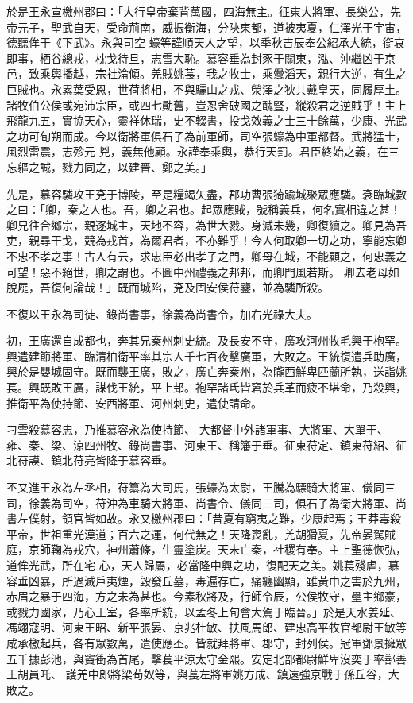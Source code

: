 \begin{pinyinscope}
 於是王永宣檄州郡曰：「大行皇帝棄背萬國，四海無主。征東大將軍、長樂公，先帝元子，聖武自天，受命荊南，威振衡海，分陜東都，道被夷夏，仁澤光于宇宙，德聽侔于《下武》。永與司空
 蠔等謹順天人之望，以季秋吉辰奉公紹承大統，銜哀即事，栖谷總戎，枕戈待旦，志雪大恥。慕容垂為封豕于關東，泓、沖繼凶于京邑，致乘輿播越，宗社淪傾。羌賊姚萇，我之牧士，乘釁滔天，親行大逆，有生之巨賊也。永累葉受恩，世荷將相，不與驪山之戎、滎澤之狄共戴皇天，同履厚土。諸牧伯公侯或宛沛宗臣，或四七勛舊，豈忍舍破國之醜豎，縱殺君之逆賊乎！主上飛龍九五，實協天心，靈祥休瑞，史不輟書，投戈效義之士三十餘萬，少康、光武之功可旬朔而成。今以衛將軍俱石子為前軍師，司空張蠔為中軍都督。武將猛士，風烈雷震，志殄元
 兇，義無他顧。永謹奉乘輿，恭行天罰。君臣終始之義，在三忘軀之誠，戮力同之，以建晉、鄭之美。」



 先是，慕容驎攻王兗于博陵，至是糧竭矢盡，郡功曹張猗踰城聚眾應驎。袞臨城數之曰：「卿，秦之人也。吾，卿之君也。起眾應賊，號稱義兵，何名實相違之甚！卿兄往合鄉宗，親逐城主，天地不容，為世大戮。身滅未幾，卿復續之。卿見為吾吏，親尋干戈，競為戎首，為爾君者，不亦難乎！今人何取卿一切之功，寧能忘卿不忠不孝之事！古人有云，求忠臣必出孝子之門，卿母在城，不能顧之，何忠義之可望！惡不絕世，卿之謂也。不圖中州禮義之邦邦，而卿門風若斯。
 卿去老母如脫屣，吾復何論哉！」既而城陷，兗及固安侯苻鑒，並為驎所殺。



 丕復以王永為司徒、錄尚書事，徐義為尚書令，加右光祿大夫。



 初，王廣還自成都也，奔其兄秦州刺史統。及長安不守，廣攻河州牧毛興于枹罕。興遣建節將軍、臨清柏衛平率其宗人千七百夜擊廣軍，大敗之。王統復遣兵助廣，興於是嬰城固守。既而襲王廣，敗之，廣亡奔秦州，為隴西鮮卑匹蘭所執，送詣姚萇。興既敗王廣，謀伐王統，平上邽。袍罕諸氐皆窘於兵革而疲不堪命，乃殺興，推衛平為使持節、安西將軍、河州刺史，遣使請命。



 刁雲殺慕容忠，乃推慕容永為使持節、
 大都督中外諸軍事、大將軍、大單于、雍、秦、梁、涼四州牧、錄尚書事、河東王、稱籓于垂。征東苻定、鎮東苻紹、征北苻謨、鎮北苻亮皆降于慕容垂。



 丕又進王永為左丞相，苻纂為大司馬，張蠔為太尉，王騰為驃騎大將軍、儀同三司，徐義為司空，苻沖為車騎大將軍、尚書令、儀同三司，俱石子為衛大將軍、尚書左僕射，領官皆如故。永又檄州郡曰：「昔夏有窮夷之難，少康起焉；王莽毒殺平帝，世祖重光漢道；百六之運，何代無之！天降喪亂，羌胡猾夏，先帝晏駕賊庭，京師鞠為戎穴，神州蕭條，生靈塗炭。天未亡秦，社稷有奉。主上聖德恢弘，道侔光武，所在宅
 心，天人歸屬，必當隆中興之功，復配天之美。姚萇殘虐，慕容垂凶暴，所過滅戶夷煙，毀發丘墓，毒遍存亡，痛纏幽顯，雖黃巾之害於九州，赤眉之暴于四海，方之未為甚也。今素秋將及，行師令辰，公侯牧守，壘主鄉豪，或戮力國家，乃心王室，各率所統，以孟冬上旬會大駕于臨晉。」於是天水姜延、馮翊寇明、河東王昭、新平張晏、京兆杜敏、扶風馬郎、建忠高平牧官都尉王敏等咸承檄起兵，各有眾數萬，遣使應丕。皆就拜將軍、郡守，封列侯。冠軍鄧景擁眾五千據彭池，與竇衝為首尾，擊萇平涼太守金熙。安定北部都尉鮮卑沒奕于率鄯善王胡員吒、
 護羌中郎將梁茍奴等，與萇左將軍姚方成、鎮遠強京戰于孫丘谷，大敗之。




\end{pinyinscope}
